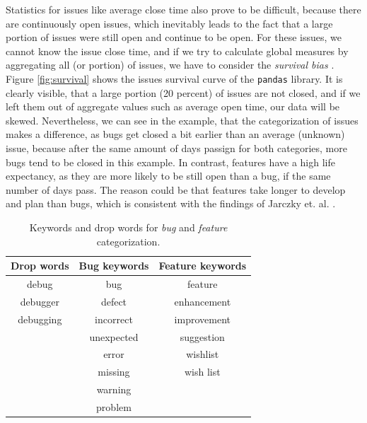 Statistics for issues like average close time also prove to be difficult, because there are continuously open issues, which inevitably leads to the fact that a large portion of issues were still open and continue to be open. For these issues, we cannot know the issue close time, and if we try to calculate global measures by aggregating all (or portion) of issues, we have to consider the \textit{survival bias} \cite{jarczykSurgicalTeamsGitHub2018}. Figure \ref{fig:survival} shows the issues survival curve of the \texttt{pandas} library. It is clearly visible, that a large portion (20 percent) of issues are not closed, and if we left them out of aggregate values such as average open time, our data will be skewed. Nevertheless, we can see in the example, that the categorization of issues makes a difference, as bugs get closed a bit earlier than an average (unknown) issue, because after the same amount of days passign for both categories, more bugs tend to be closed in this example. In contrast, features have a high life expectancy, as they are more likely to be still open than a bug, if the same number of days pass. The reason could be that features take longer to develop and plan than bugs, which is consistent with the findings of Jarczky et. al. \cite{jarczykSurgicalTeamsGitHub2018}.

\begin{table}
    \centering
        \begin{tabular}{| c | c | c |}
            \hline
            \textbf{Drop words} & \textbf{Bug keywords} & \textbf{Feature keywords} \\
            \hline \hline
            debug & bug & feature \\
            debugger & defect & enhancement \\
            debugging & incorrect & improvement \\
             & unexpected & suggestion \\
             & error & wishlist \\
             & missing & wish list \\
             & warning & \\
             & problem & \\
            \hline
        \end{tabular}
    \caption{Keywords and drop words for \textit{bug} and \textit{feature} categorization.}
    \label{tab:keywords}
\end{table}


